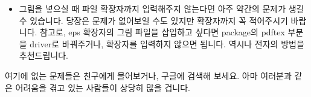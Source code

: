 \begin{itemize}
	\item 그림을 넣으실 때 파일 확장자까지 입력해주지 않는다면 아주 약간의 문제가 생길 수 있습니다.
	당장은 문제가 없어보일 수도 있지만 확장자까지 꼭 적어주시기 바랍니다.
	참고로, eps 확장자의 그림 파일을 삽입하고 싶다면 package의 pdftex 부분을 driver로 바꿔주거나, 확장자를 입력하지 않으면 됩니다.
	역시나 전자의 방법을 추천드립니다.
	
	
\end{itemize}
여기에 없는 문제들은 친구에게 물어보거나, 구글에 검색해 보세요. 아마 여러분과 같은 어려움을 겪고 있는 사람들이 상당히 많을 겁니다.

